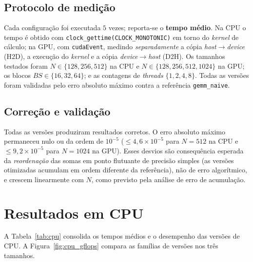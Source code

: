 \documentclass{sbc2023}%
\begin{document}
\subsection{Protocolo de medição}

Cada configuração foi executada $5$ vezes; reporta-se o \textbf{tempo médio}. Na CPU o tempo é obtido com \texttt{clock\_gettime(CLOCK\_MONOTONIC)} em torno do \textit{kernel} de cálculo; na GPU, com \texttt{cudaEvent}, medindo \emph{separadamente} a cópia \textit{host}$\rightarrow$\textit{device} (H2D), a execução do \textit{kernel} e a cópia \textit{device}$\rightarrow$\textit{host} (D2H). Os tamanhos testados foram $N \in \{128, 256, 512\}$ na CPU e $N \in \{128, 256, 512, 1024\}$ na GPU; os blocos $BS \in \{16, 32, 64\}$; e as contagens de \textit{threads} $\{1, 2, 4, 8\}$. Todas as versões foram validadas pelo erro absoluto máximo contra a referência \texttt{gemm\_naive}.

\subsection{Correção e validação}

Todas as versões produziram resultados corretos. O erro absoluto máximo permaneceu nulo ou da ordem de $10^{-5}$ ($\leq 4{,}6\times10^{-5}$ para $N=512$ na CPU e $\leq 9{,}2\times10^{-5}$ para $N=1024$ na GPU). Esses desvios são consequência esperada da \emph{reordenação} das somas em ponto flutuante de precisão simples (as versões otimizadas acumulam em ordem diferente da referência), não de erro algorítmico, e crescem linearmente com $N$, como previsto pela análise de erro de acumulação.


\section{Resultados em CPU}
\label{sec:cpu}

A Tabela~\ref{tab:cpu} consolida os tempos médios e o desempenho das versões de CPU. A Figura~\ref{fig:cpu_gflops} compara as famílias de versões nos três tamanhos.
\end{document}

